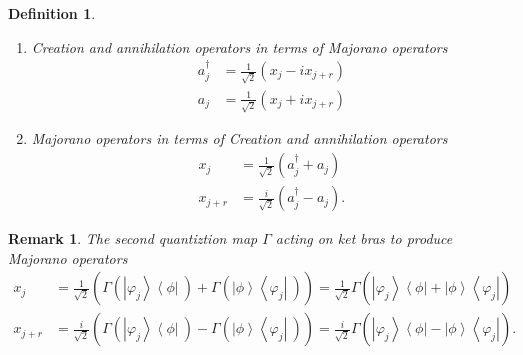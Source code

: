 \documentclass[aps,preprint]{revtex4}%
\newtheorem{definition}[theorem]{Definition}
\newtheorem{remark}[theorem]{Remark}
\begin{document}
\begin{definition}
\begin{enumerate}
\item Creation and annihilation operators in terms of Majorano operators
\begin{align}
a_{j}^{\dagger}  &  =\frac{1}{\sqrt{2}}\left(  x_{j}-ix_{j+r}\right) \\
a_{j}  &  =\frac{1}{\sqrt{2}}\left(  x_{j}+ix_{j+r}\right)
\end{align}


\item Majorano operators in terms of Creation and annihilation operators
\begin{align}
x_{j}  &  =\frac{1}{\sqrt{2}}\left(  a_{j}^{\dagger}+a_{j}\right) \\
x_{j+r}  &  =\frac{i}{\sqrt{2}}\left(  a_{j}^{\dagger}-a_{j}\right)  .
\end{align}

\end{enumerate}
\end{definition}

\begin{remark}
The second quantiztion map $\Gamma$ acting on ket bras to produce Majorano
operators%
\begin{align}
x_{j}  &  =\frac{1}{\sqrt{2}}\left(  \overset{}{\Gamma\left(  \left\vert
\varphi_{j}\right\rangle \left\langle \phi\right\vert \ \right)
+\Gamma\left(  \left\vert \phi\right\rangle \left\langle \varphi
_{j}\right\vert \ \right)  }\right)  =\frac{1}{\sqrt{2}}\Gamma\left(
\overset{}{\left\vert \varphi_{j}\right\rangle \left\langle \phi\right\vert
+\left\vert \phi\right\rangle \left\langle \varphi_{j}\right\vert }\right) \\
x_{j+r}  &  =\frac{i}{\sqrt{2}}\left(  \overset{}{\Gamma\left(  \left\vert
\varphi_{j}\right\rangle \left\langle \phi\right\vert \ \right)
-\Gamma\left(  \left\vert \phi\right\rangle \left\langle \varphi
_{j}\right\vert \ \right)  }\right)  =\frac{i}{\sqrt{2}}\Gamma\left(
\overset{}{\left\vert \varphi_{j}\right\rangle \left\langle \phi\right\vert
-\left\vert \phi\right\rangle \left\langle \varphi_{j}\right\vert }\right)  .
\end{align}

\end{remark}
\end{document}
